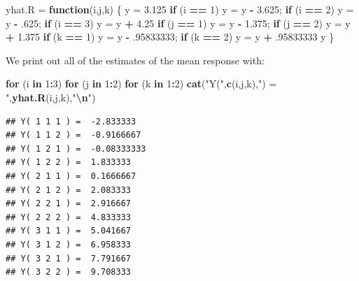 \documentclass[
  11pt,
]{article}
\newenvironment{Shaded}{\begin{snugshade}}{\end{snugshade}}
\newcommand{\ControlFlowTok}[1]{\textcolor[rgb]{0.13,0.29,0.53}{\textbf{#1}}}
\newcommand{\DecValTok}[1]{\textcolor[rgb]{0.00,0.00,0.81}{#1}}
\newcommand{\FloatTok}[1]{\textcolor[rgb]{0.00,0.00,0.81}{#1}}
\newcommand{\FunctionTok}[1]{\textcolor[rgb]{0.13,0.29,0.53}{\textbf{#1}}}
\newcommand{\NormalTok}[1]{#1}
\newcommand{\OtherTok}[1]{\textcolor[rgb]{0.56,0.35,0.01}{#1}}
\newcommand{\SpecialCharTok}[1]{\textcolor[rgb]{0.81,0.36,0.00}{\textbf{#1}}}
\newcommand{\StringTok}[1]{\textcolor[rgb]{0.31,0.60,0.02}{#1}}
\begin{document}
\begin{Shaded}
\begin{Highlighting}[]
\NormalTok{yhat.R }\OtherTok{=} \ControlFlowTok{function}\NormalTok{(i,j,k)}
\NormalTok{\{}
\NormalTok{  y }\OtherTok{=} \FloatTok{3.125}
  \ControlFlowTok{if}\NormalTok{ (i }\SpecialCharTok{==} \DecValTok{1}\NormalTok{) y }\OtherTok{=}\NormalTok{ y }\SpecialCharTok{{-}} \FloatTok{3.625}\NormalTok{; }\ControlFlowTok{if}\NormalTok{ (i }\SpecialCharTok{==} \DecValTok{2}\NormalTok{) y }\OtherTok{=}\NormalTok{ y }\SpecialCharTok{{-}}\NormalTok{ .}\DecValTok{625}\NormalTok{; }\ControlFlowTok{if}\NormalTok{ (i }\SpecialCharTok{==} \DecValTok{3}\NormalTok{) y }\OtherTok{=}\NormalTok{ y }\SpecialCharTok{+} \FloatTok{4.25}
  \ControlFlowTok{if}\NormalTok{ (j }\SpecialCharTok{==} \DecValTok{1}\NormalTok{) y }\OtherTok{=}\NormalTok{ y }\SpecialCharTok{{-}} \FloatTok{1.375}\NormalTok{; }\ControlFlowTok{if}\NormalTok{ (j }\SpecialCharTok{==} \DecValTok{2}\NormalTok{) y }\OtherTok{=}\NormalTok{ y }\SpecialCharTok{+} \FloatTok{1.375}
  \ControlFlowTok{if}\NormalTok{ (k }\SpecialCharTok{==} \DecValTok{1}\NormalTok{) y }\OtherTok{=}\NormalTok{ y }\SpecialCharTok{{-}}\NormalTok{ .}\DecValTok{95833333}\NormalTok{; }\ControlFlowTok{if}\NormalTok{ (k }\SpecialCharTok{==} \DecValTok{2}\NormalTok{) y }\OtherTok{=}\NormalTok{ y }\SpecialCharTok{+}\NormalTok{ .}\DecValTok{95833333}
\NormalTok{  y}
\NormalTok{\}}
\end{Highlighting}
\end{Shaded}

We print out all of the estimates of the mean response with:

\begin{Shaded}
\begin{Highlighting}[]
\ControlFlowTok{for}\NormalTok{ (i }\ControlFlowTok{in} \DecValTok{1}\SpecialCharTok{:}\DecValTok{3}\NormalTok{)}
  \ControlFlowTok{for}\NormalTok{ (j }\ControlFlowTok{in} \DecValTok{1}\SpecialCharTok{:}\DecValTok{2}\NormalTok{)}
    \ControlFlowTok{for}\NormalTok{ (k }\ControlFlowTok{in} \DecValTok{1}\SpecialCharTok{:}\DecValTok{2}\NormalTok{)}
      \FunctionTok{cat}\NormalTok{(}\StringTok{"Y("}\NormalTok{,}\FunctionTok{c}\NormalTok{(i,j,k),}\StringTok{") = "}\NormalTok{,}\FunctionTok{yhat.R}\NormalTok{(i,j,k),}\StringTok{"}\SpecialCharTok{\textbackslash{}n}\StringTok{"}\NormalTok{)}
\end{Highlighting}
\end{Shaded}

\begin{verbatim}
## Y( 1 1 1 ) =  -2.833333 
## Y( 1 1 2 ) =  -0.9166667 
## Y( 1 2 1 ) =  -0.08333333 
## Y( 1 2 2 ) =  1.833333 
## Y( 2 1 1 ) =  0.1666667 
## Y( 2 1 2 ) =  2.083333 
## Y( 2 2 1 ) =  2.916667 
## Y( 2 2 2 ) =  4.833333 
## Y( 3 1 1 ) =  5.041667 
## Y( 3 1 2 ) =  6.958333 
## Y( 3 2 1 ) =  7.791667 
## Y( 3 2 2 ) =  9.708333
\end{verbatim}
\end{document}
